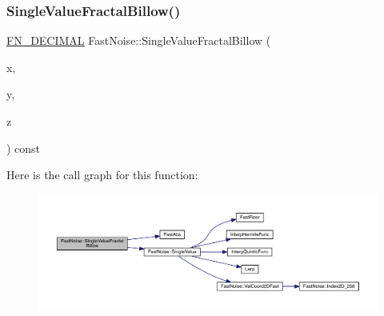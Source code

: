 \subsubsection{\texorpdfstring{Single\+Value\+Fractal\+Billow()}{SingleValueFractalBillow()}\hspace{0.1cm}{\footnotesize\ttfamily [2/2]}}
{\footnotesize\ttfamily \mbox{\hyperlink{_fast_noise_8h_a75a9ef6d2541c4921815b885bfd449c3}{F\+N\+\_\+\+D\+E\+C\+I\+M\+AL}} Fast\+Noise\+::\+Single\+Value\+Fractal\+Billow (\begin{DoxyParamCaption}\item[{\mbox{\hyperlink{_fast_noise_8h_a75a9ef6d2541c4921815b885bfd449c3}{F\+N\+\_\+\+D\+E\+C\+I\+M\+AL}}}]{x,  }\item[{\mbox{\hyperlink{_fast_noise_8h_a75a9ef6d2541c4921815b885bfd449c3}{F\+N\+\_\+\+D\+E\+C\+I\+M\+AL}}}]{y,  }\item[{\mbox{\hyperlink{_fast_noise_8h_a75a9ef6d2541c4921815b885bfd449c3}{F\+N\+\_\+\+D\+E\+C\+I\+M\+AL}}}]{z }\end{DoxyParamCaption}) const\hspace{0.3cm}{\ttfamily [private]}}

Here is the call graph for this function\+:
\nopagebreak
\begin{figure}[H]
\begin{center}
\leavevmode
\includegraphics[width=350pt]{d1/dd8/class_fast_noise_ac2534a36b0dfb1c6337a512787511754_cgraph}
\end{center}
\end{figure}
\mbox{\label{class_fast_noise_a19cdde687bd3d06fa84ea16f52dfe96b}} 
